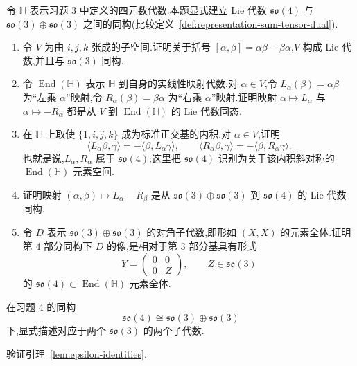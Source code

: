 {\begin{exercise}\label{ex:so4-so3-direct-sum}
令 $\mathbb H$ 表示习题 3 中定义的四元数代数.本题显式建立 Lie 代数 $\mathfrak{so}(4)$ 与 $\mathfrak{so}(3)\oplus\mathfrak{so}(3)$ 之间的同构(比较定义~\ref{def:representation-sum-tensor-dual}).
\begin{enumerate}
\item 令 $V$ 为由 $i,j,k$ 张成的子空间.证明关于括号 $[\alpha,\beta]=\alpha\beta-\beta\alpha$,$V$ 构成 Lie 代数,并且与 $\mathfrak{so}(3)$ 同构.
\item 令 $\operatorname{End}(\mathbb H)$ 表示 $\mathbb H$ 到自身的实线性映射代数.对 $\alpha\in V$,令 $L_\alpha(\beta)=\alpha\beta$ 为“左乘 $\alpha$”映射,令 $R_\alpha(\beta)=\beta\alpha$ 为“右乘 $\alpha$”映射.证明映射 $\alpha\mapsto L_\alpha$ 与 $\alpha\mapsto-R_\alpha$ 都是从 $V$ 到 $\operatorname{End}(\mathbb H)$ 的 Lie 代数同态.
\item 在 $\mathbb H$ 上取使 $\{1,i,j,k\}$ 成为标准正交基的内积.对 $\alpha\in V$,证明
\[
 \langle L_\alpha\beta,\gamma\rangle=-\langle\beta,L_\alpha\gamma\rangle,
 \qquad
 \langle R_\alpha\beta,\gamma\rangle=-\langle\beta,R_\alpha\gamma\rangle.
\]
也就是说,$L_\alpha,R_\alpha$ 属于 $\mathfrak{so}(4)$;这里把 $\mathfrak{so}(4)$ 识别为关于该内积斜对称的 $\operatorname{End}(\mathbb H)$ 元素空间.
\item 证明映射 $(\alpha,\beta)\mapsto L_\alpha-R_\beta$ 是从 $\mathfrak{so}(3)\oplus\mathfrak{so}(3)$ 到 $\mathfrak{so}(4)$ 的 Lie 代数同构.
\item 令 $D$ 表示 $\mathfrak{so}(3)\oplus\mathfrak{so}(3)$ 的对角子代数,即形如 $(X,X)$ 的元素全体.证明第 4 部分同构下 $D$ 的像,是相对于第 3 部分基具有形式
\[
 Y=\begin{pmatrix}0&0\\0&Z\end{pmatrix},
 \qquad Z\in\mathfrak{so}(3)
\]
的 $\mathfrak{so}(4)\subset\operatorname{End}(\mathbb H)$ 元素全体.
\end{enumerate}
\end{exercise}

\begin{exercise}\label{ex:so4-subalgebras}
在习题 4 的同构
\[
 \mathfrak{so}(4)\cong\mathfrak{so}(3)\oplus\mathfrak{so}(3)
\]
下,显式描述对应于两个 $\mathfrak{so}(3)$ 的两个子代数.
\end{exercise}

\begin{exercise}\label{ex:verify-epsilon-identities}
验证引理~\ref{lem:epsilon-identities}.


\end{exercise}}
